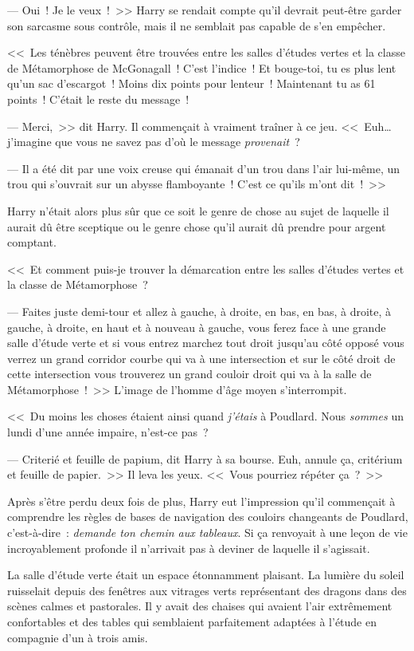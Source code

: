 --- Oui~! Je le veux~!~>> Harry se rendait compte qu'il devrait peut-être garder son sarcasme sous contrôle, mais il ne semblait pas capable de s'en empêcher.

<<~Les ténèbres peuvent être trouvées entre les salles d'études vertes et la classe de Métamorphose de McGonagall~! C'est l'indice~! Et bouge-toi, tu es plus lent qu'un sac d'escargot~! Moins dix points pour lenteur~! Maintenant tu as 61 points~! C'était le reste du message~!

--- Merci,~>> dit Harry. Il commençait à vraiment traîner à ce jeu. <<~Euh… j'imagine que vous ne savez pas d'où le message \emph{provenait}~?

--- Il a été dit par une voix creuse qui émanait d'un trou dans l'air lui-même, un trou qui s'ouvrait sur un abysse flamboyante~! C'est ce qu'ils m'ont dit~!~>>

Harry n'était alors plus sûr que ce soit le genre de chose au sujet de laquelle il aurait dû être sceptique ou le genre chose qu'il aurait dû prendre pour argent comptant.

<<~Et comment puis-je trouver la démarcation entre les salles d'études vertes et la classe de Métamorphose~?

--- Faites juste demi-tour et allez à gauche, à droite, en bas, en bas, à droite, à gauche, à droite, en haut et à nouveau à gauche, vous ferez face à une grande salle d'étude verte et si vous entrez marchez tout droit jusqu'au côté opposé vous verrez un grand corridor courbe qui va à une intersection et sur le côté droit de cette intersection vous trouverez un grand couloir droit qui va à la salle de Métamorphose~!~>> L'image de l'homme d'âge moyen s'interrompit.

<<~Du moins les choses étaient ainsi quand \emph{j'étais} à Poudlard. Nous \emph{sommes} un lundi d'une année impaire, n'est-ce pas~?

--- Criterié et feuille de papium, dit Harry à sa bourse. Euh, annule ça, critérium et feuille de papier.~>> Il leva les yeux. <<~Vous pourriez répéter ça~?~>>

Après s'être perdu deux fois de plus, Harry eut l'impression qu'il commençait à comprendre les règles de bases de navigation des couloirs changeants de Poudlard, c'est-à-dire~: \emph{demande ton chemin aux tableaux}. Si ça renvoyait à une leçon de vie incroyablement profonde il n'arrivait pas à deviner de laquelle il s'agissait.

La salle d'étude verte était un espace étonnamment plaisant. La lumière du soleil ruisselait depuis des fenêtres aux vitrages verts représentant des dragons dans des scènes calmes et pastorales. Il y avait des chaises qui avaient l'air extrêmement confortables et des tables qui semblaient parfaitement adaptées à l'étude en compagnie d'un à trois amis.

